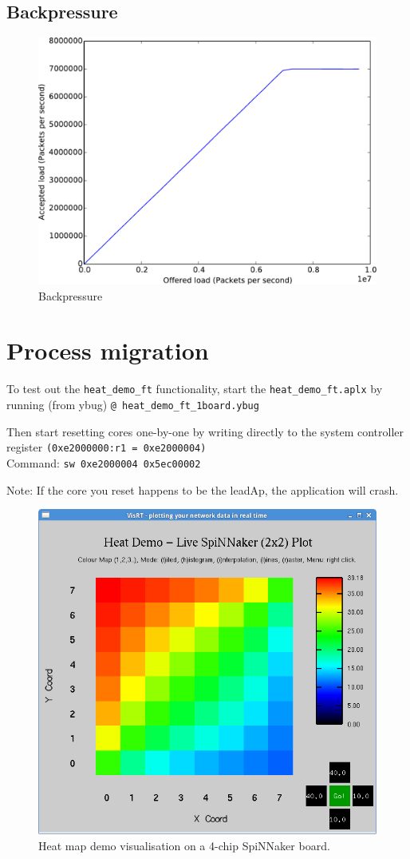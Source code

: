 \documentclass[a4paper, 11pt]{article}
\begin{document}
\clearpage
\subsection{Backpressure}
\begin{figure}[htbp]
	\centering
	\includegraphics[width=0.6\linewidth]{images/backpressure2.pdf}
	\caption{Backpressure}	
	\label{fig:backpressure}
\end{figure}

\section{Process migration}

To test out the \verb|heat_demo_ft| functionality, start the \verb|heat_demo_ft.aplx|
by running (from ybug) \verb|@ heat_demo_ft_1board.ybug|

Then start resetting cores one-by-one by writing directly to the system
controller register \verb|(0xe2000000:r1 = 0xe2000004)|\\
Command: \verb|sw 0xe2000004 0x5ec00002|

Note: If the core you reset happens to be the leadAp, the application will
crash.

\begin{figure}[htbp]
	\centering
	\includegraphics[width=0.6\linewidth]{images/heatmap2x2.png}
	\caption{Heat map demo visualisation on a 4-chip SpiNNaker board.}	
\end{figure}
\end{document}

